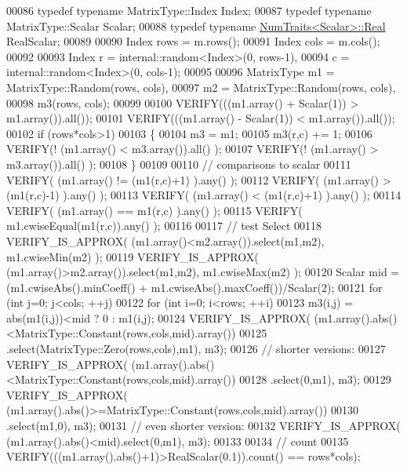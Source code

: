 \begin{DoxyCode}
00086   \textcolor{keyword}{typedef} \textcolor{keyword}{typename} MatrixType::Index Index;
00087   \textcolor{keyword}{typedef} \textcolor{keyword}{typename} MatrixType::Scalar Scalar;
00088   \textcolor{keyword}{typedef} \textcolor{keyword}{typename} \hyperlink{group___core___module_struct_eigen_1_1_num_traits}{NumTraits<Scalar>::Real} RealScalar;
00089 
00090   Index rows = m.rows();
00091   Index cols = m.cols();
00092 
00093   Index r = internal::random<Index>(0, rows-1),
00094         c = internal::random<Index>(0, cols-1);
00095 
00096   MatrixType m1 = MatrixType::Random(rows, cols),
00097              m2 = MatrixType::Random(rows, cols),
00098              m3(rows, cols);
00099 
00100   VERIFY(((m1.array() + Scalar(1)) > m1.array()).all());
00101   VERIFY(((m1.array() - Scalar(1)) < m1.array()).all());
00102   \textcolor{keywordflow}{if} (rows*cols>1)
00103   \{
00104     m3 = m1;
00105     m3(r,c) += 1;
00106     VERIFY(! (m1.array() < m3.array()).all() );
00107     VERIFY(! (m1.array() > m3.array()).all() );
00108   \}
00109 
00110   \textcolor{comment}{// comparisons to scalar}
00111   VERIFY( (m1.array() != (m1(r,c)+1) ).any() );
00112   VERIFY( (m1.array() > (m1(r,c)-1) ).any() );
00113   VERIFY( (m1.array() < (m1(r,c)+1) ).any() );
00114   VERIFY( (m1.array() == m1(r,c) ).any() );
00115   VERIFY( m1.cwiseEqual(m1(r,c)).any() );
00116 
00117   \textcolor{comment}{// test Select}
00118   VERIFY\_IS\_APPROX( (m1.array()<m2.array()).select(m1,m2), m1.cwiseMin(m2) );
00119   VERIFY\_IS\_APPROX( (m1.array()>m2.array()).select(m1,m2), m1.cwiseMax(m2) );
00120   Scalar mid = (m1.cwiseAbs().minCoeff() + m1.cwiseAbs().maxCoeff())/Scalar(2);
00121   \textcolor{keywordflow}{for} (\textcolor{keywordtype}{int} j=0; j<cols; ++j)
00122   \textcolor{keywordflow}{for} (\textcolor{keywordtype}{int} i=0; i<rows; ++i)
00123     m3(i,j) = abs(m1(i,j))<mid ? 0 : m1(i,j);
00124   VERIFY\_IS\_APPROX( (m1.array().abs()<MatrixType::Constant(rows,cols,mid).array())
00125                         .select(MatrixType::Zero(rows,cols),m1), m3);
00126   \textcolor{comment}{// shorter versions:}
00127   VERIFY\_IS\_APPROX( (m1.array().abs()<MatrixType::Constant(rows,cols,mid).array())
00128                         .select(0,m1), m3);
00129   VERIFY\_IS\_APPROX( (m1.array().abs()>=MatrixType::Constant(rows,cols,mid).array())
00130                         .select(m1,0), m3);
00131   \textcolor{comment}{// even shorter version:}
00132   VERIFY\_IS\_APPROX( (m1.array().abs()<mid).select(0,m1), m3);
00133 
00134   \textcolor{comment}{// count}
00135   VERIFY(((m1.array().abs()+1)>RealScalar(0.1)).count() == rows*cols);

\end{DoxyCode}
